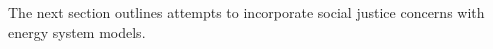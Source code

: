 
The next section outlines attempts to incorporate social justice concerns with
energy system models.








